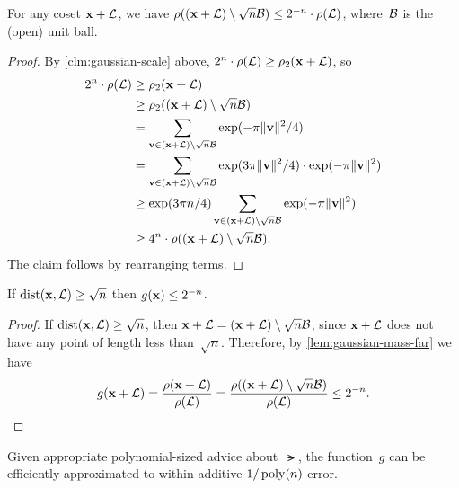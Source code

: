 \documentclass[11pt]{article}
\begin{document}
\begin{lemma}
  \label{lem:gaussian-mass-far}
  For any coset $\mathbf{x} + \mathcal{L}$, we have
  $\rho((\mathbf{x} + \mathcal{L}) \setminus \sqrt{n}\mathcal{B}) \leq 2^{-n} \cdot
  \rho(\mathcal{L})$, where~$\mathcal{B}$ is the (open) unit ball.
\end{lemma}

\begin{proof}
  By \cref{clm:gaussian-scale} above,
  $2^n \cdot \rho(\mathcal{L}) \geq \rho_2(\mathbf{x} + \mathcal{L})$, so
  \begin{align*}
    2^n \cdot \rho(\mathcal{L})
    &\geq \rho_2(\mathbf{x} + \mathcal{L}) \\
    &\geq \rho_2((\mathbf{x} + \mathcal{L})\setminus \sqrt{n}\mathcal{B}) \\
    &= \sum_{\mathbf{v} \in (\mathbf{x} + \mathcal{L}) \setminus \sqrt{n}\mathcal{B}} \exp(-\pi \lVert\mathbf{v}\rVert^2/4) \\
    &= \sum_{\mathbf{v} \in (\mathbf{x} + \mathcal{L}) \setminus \sqrt{n}\mathcal{B}}
      \exp(3\pi \lVert\mathbf{v}\rVert^2/4) \cdot \exp(-\pi \lVert\mathbf{v}\rVert^2) \\
    &\geq \exp(3\pi n/4) \sum_{\mathbf{v} \in (\mathbf{x} + \mathcal{L}) \setminus
      \sqrt{n}\mathcal{B}}\exp(-\pi \lVert\mathbf{v}\rVert^2) \\
    &\geq  4^n \cdot \rho((\mathbf{x} + \mathcal{L})\setminus \sqrt{n}\mathcal{B}).
  \end{align*}
  The claim follows by rearranging terms.
\end{proof}

\begin{corollary}
  If $\operatorname{dist}(\mathbf{x},\mathcal{L}) \geq \sqrt{n}$ then $g(\mathbf{x}) \leq 2^{-n}$.
\end{corollary}

\begin{proof}
  If $\operatorname{dist}(\mathbf{x},\mathcal{L}) \geq \sqrt{n}$, then
  $\mathbf{x} + \mathcal{L} = (\mathbf{x} + \mathcal{L}) \setminus \sqrt{n}\mathcal{B}$, since
  $\mathbf{x} + \mathcal{L}$ does not have any point of length less
  than~$\sqrt{n}$. Therefore, by \cref{lem:gaussian-mass-far} we have
  \[ g(\mathbf{x} + \mathcal{L}) = \frac{\rho(\mathbf{x} + \mathcal{L})}{\rho(\mathcal{L})} =
    \frac{\rho((\mathbf{x} + \mathcal{L})\setminus \sqrt{n}\mathcal{B})}{\rho(\mathcal{L})}
    \leq 2^{-n} . \]
\end{proof}

\begin{lemma}
  Given appropriate polynomial-sized advice about~$\lat$, the
  function~$g$ can be efficiently approximated to within additive
  $1/\operatorname{poly}(n)$ error.
\end{lemma}
\end{document}
